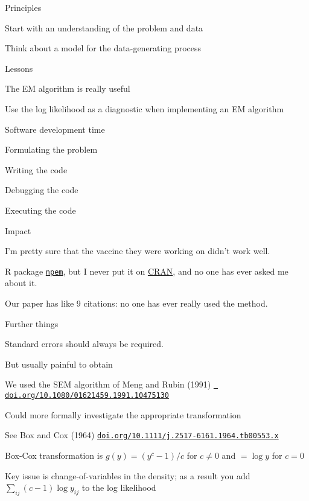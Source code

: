 \documentclass[aspectratio=169,12pt,t]{beamer}
\begin{document}
\begin{frame}{Principles}

  \bbi
\item Start with an understanding of the problem and data
\item Think about a model for the data-generating process
  \ei
\end{frame}



\begin{frame}{Lessons}

  \bbi
\item The EM algorithm is really useful
\item Use the log likelihood as a diagnostic when implementing an EM
  algorithm
  \ei
\end{frame}


\begin{frame}{Software development time}

  \bbi
\item Formulating the problem
\item Writing the code
\item Debugging the code
\item Executing the code
  \ei

\end{frame}


\begin{frame}{Impact}

  \bbi
\item I'm pretty sure that the vaccine they were working on didn't
  work well.
\item R package \href{https://github.com/kbroman/npem}{\tt npem}, but
  I never put it on \href{https://cran.r-project.org}{CRAN}, and no
  one has ever asked me about it.
\item Our paper has like 9 citations: no one has ever really used the
  method.
  \ei

\end{frame}


\begin{frame}{Further things}

  \bbi

\item Standard errors should always be required.
  \bi
\item But usually painful to obtain
\item We used the SEM algorithm of Meng and Rubin (1991)
  \href{https://doi.org/10.1080/01621459.1991.10475130}{\tt
    doi.org/10.1080/01621459.1991.10475130}
  \ei

\item Could more formally investigate the appropriate transformation
  \bi
\item See Box and Cox (1964) \href{https://doi.org/10.1111/j.2517-6161.1964.tb00553.x}{
  \tt doi.org/10.1111/j.2517-6161.1964.tb00553.x}
\item Box-Cox transformation is $g(y) = (y^c-1)/c$ for $c \ne 0$ and
  $= \log y$ for $c=0$
\item Key issue is change-of-variables in the density; as a result you
  add $\sum_{ij} (c-1) \log y_{ij}$ to the log likelihood
    \ei
    \ei
\end{frame}
\end{document}

